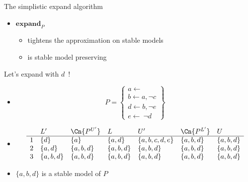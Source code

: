 \begin{frame}{The simplistic expand algorithm}
  \bigskip
  \begin{itemize}
  \item $\mathbf{expand}_{P}$
  \begin{itemize}
  \item tightens the approximation on stable models
  \item is stable model preserving
  \end{itemize}
\end{itemize}
\end{frame}
\begin{frame}{Let's expand with $d$~!}
\begin{itemize}
\item<1-> []
\[
P
=
\left\{
  \begin{array}{l}
    a\leftarrow\\  b\leftarrow a,\neg c\\ d\leftarrow b,\neg e\\ e\leftarrow~\neg d
  \end{array}
\right\}
\]
\item<2-> []
\[
\begin{array}{cllllll}
  & L'        & \Cn{P^{U'}} & L         & U'            & \Cn{P^{L'}} & U        \\
\hline
1 & \{d\}     & \{a\}         & \{a,d\}   & \{a,b,c,d,e\} & \{a,b,d\}     & \{a,b,d\}\\
2 & \{a,d\}   & \{a,b,d\}     & \{a,b,d\} & \{a,b,d\}     & \{a,b,d\}     & \{a,b,d\}\\
3 & \{a,b,d\} & \{a,b,d\}     & \{a,b,d\} & \{a,b,d\}     & \{a,b,d\}     & \{a,b,d\}\\
\end{array}
\]
\medskip
\item<3->  $\{a,b,d\}$ is a stable model of $P$
\end{itemize}
\end{frame}
